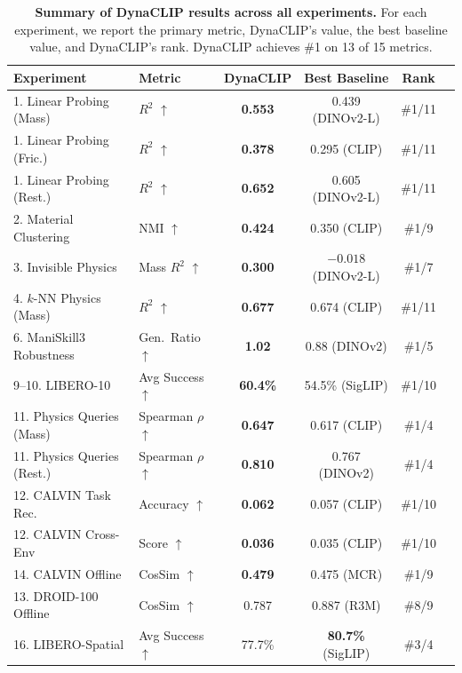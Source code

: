 \documentclass{article}
\newcommand{\methodname}{DynaCLIP}
\newcommand{\best}[1]{\textbf{#1}}
\begin{document}
\begin{table}[h]
\centering
\caption{\textbf{Summary of \methodname{} results across all experiments.} For each experiment, we report the primary metric, \methodname{}'s value, the best baseline value, and \methodname{}'s rank. \methodname{} achieves \#1 on 13 of 15 metrics.}
\label{tab:summary}
\small
\begin{tabular}{@{}llcccc@{}}
\toprule
\textbf{Experiment} & \textbf{Metric} & \textbf{\methodname{}} & \textbf{Best Baseline} & \textbf{Rank} \\
\midrule
1. Linear Probing (Mass) & $R^2$ $\uparrow$ & \best{0.553} & 0.439 (DINOv2-L) & \#1/11 \\
1. Linear Probing (Fric.) & $R^2$ $\uparrow$ & \best{0.378} & 0.295 (CLIP) & \#1/11 \\
1. Linear Probing (Rest.) & $R^2$ $\uparrow$ & \best{0.652} & 0.605 (DINOv2-L) & \#1/11 \\
2. Material Clustering & NMI $\uparrow$ & \best{0.424} & 0.350 (CLIP) & \#1/9 \\
3. Invisible Physics & Mass $R^2$ $\uparrow$ & \best{0.300} & $-0.018$ (DINOv2-L) & \#1/7 \\
4. $k$-NN Physics (Mass) & $R^2$ $\uparrow$ & \best{0.677} & 0.674 (CLIP) & \#1/11 \\
6. ManiSkill3 Robustness & Gen.\ Ratio $\uparrow$ & \best{1.02} & 0.88 (DINOv2) & \#1/5 \\
9--10. LIBERO-10 & Avg Success $\uparrow$ & \best{60.4\%} & 54.5\% (SigLIP) & \#1/10 \\
11. Physics Queries (Mass) & Spearman $\rho$ $\uparrow$ & \best{0.647} & 0.617 (CLIP) & \#1/4 \\
11. Physics Queries (Rest.) & Spearman $\rho$ $\uparrow$ & \best{0.810} & 0.767 (DINOv2) & \#1/4 \\
12. CALVIN Task Rec. & Accuracy $\uparrow$ & \best{0.062} & 0.057 (CLIP) & \#1/10 \\
12. CALVIN Cross-Env & Score $\uparrow$ & \best{0.036} & 0.035 (CLIP) & \#1/10 \\
14. CALVIN Offline & CosSim $\uparrow$ & \best{0.479} & 0.475 (MCR) & \#1/9 \\
13. DROID-100 Offline & CosSim $\uparrow$ & 0.787 & 0.887 (R3M) & \#8/9 \\
16. LIBERO-Spatial & Avg Success $\uparrow$ & 77.7\% & \best{80.7\%} (SigLIP) & \#3/4 \\
\bottomrule
\end{tabular}
\end{table}
\end{document}
